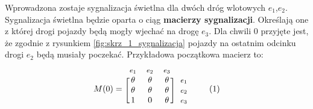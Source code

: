 \documentclass[12pt]{book}
\theoremstyle{plain}
\newcommand\addtag{\refstepcounter{equation}
\renewcommand{\labelenumii}{\theenumii}
\renewcommand{\theenumii}{\theenumi.\arabic{enumii}.}
\tag{\theequation}}
\begin{document}
Wprowadzona zostaje sygnalizacja świetlna dla dwóch dróg wlotowych $e_1$,$e_2$. Sygnalizacja świetlna będzie oparta o ciąg \textbf{macierzy sygnalizacji}. Określają one z której drogi pojazdy będą mogły wjechać na drogę $e_3$. Dla chwili 0 przyjęte jest, że zgodnie z rysunkiem \ref{fig:skrz_1_sygnalizacja} pojazdy na ostatnim odcinku drogi $e_2$ będą musiały poczekać. 
Przykładowa początkowa macierz to:
\begin{equation*}
  M(0)=
  \begin{blockarray}{*{3}{c} l}
    \begin{block}{*{3}{>{$\footnotesize}c<{$}} l}
     $e_1$ & $e_2$ & $e_3$\\
    \end{block}
    \begin{block}{[*{3}{c}]>{$\footnotesize}l<{$}}
       \theta & \theta & \theta & $e_1$ \\
       \theta & \theta & \theta & $e_2$ \\
       1 & 0 & \theta & $e_3$ \\
    \end{block}
  \end{blockarray} \addtag
\end{equation*}
\end{document}
